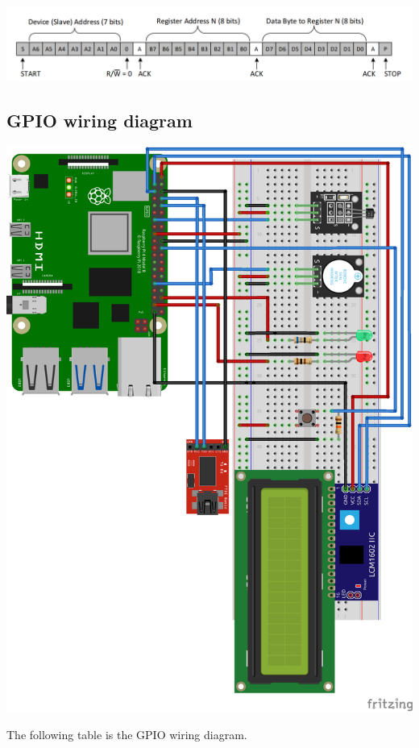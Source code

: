 \documentclass[]{article}
\begin{document}
\begin{center}
    \includegraphics[scale=0.4]{write_procedure}
\end{center}

\subsection{GPIO wiring diagram}

\begin{center}
    \includegraphics[scale=0.9]{breadboard}
\end{center}

\newpage
The following table is the GPIO wiring diagram.
\end{document}
